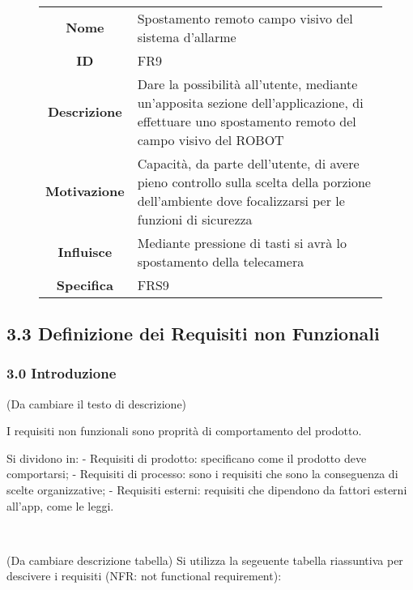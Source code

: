 \documentclass[]{article}
\begin{document}
~

\begin{figure}[htbp]
\centering
\begin{tabular}{|c|l|}
\hline

\textbf{Nome}
 & 
Spostamento remoto campo visivo del sistema d'allarme
\\

\textbf{ID}
 & 
FR9
\\

\textbf{Descrizione}
 & 
Dare la possibilità all'utente, mediante un'apposita sezione
dell'applicazione, di effettuare uno spostamento remoto del campo visivo
del ROBOT
\\

\textbf{Motivazione}
 & 
Capacità, da parte dell'utente, di avere pieno controllo sulla scelta
della porzione dell'ambiente dove focalizzarsi per le funzioni di
sicurezza
\\

\textbf{Influisce}
 & 
Mediante pressione di tasti si avrà lo spostamento della
telecamera
\\

\textbf{Specifica}
 & 
FRS9
\\
\hline
\end{tabular}
\end{figure}

\hypertarget{definizione-dei-requisiti-non-funzionali}{%
\subsection{3.3 Definizione dei Requisiti non
Funzionali}\label{definizione-dei-requisiti-non-funzionali}}

\hypertarget{introduzione-1}{%
\subsubsection{3.0 Introduzione}\label{introduzione-1}}

(Da cambiare il testo di descrizione)

I requisiti non funzionali sono proprità di comportamento del prodotto.

Si dividono in: - Requisiti di prodotto: specificano come il prodotto
deve comportarsi; - Requisiti di processo: sono i requisiti che sono la
conseguenza di scelte organizzative; - Requisiti esterni: requisiti che
dipendono da fattori esterni all'app, come le leggi.

~

(Da cambiare descrizione tabella) Si utilizza la segeuente tabella
riassuntiva per descivere i requisiti (NFR: not functional requirement):
\end{document}
